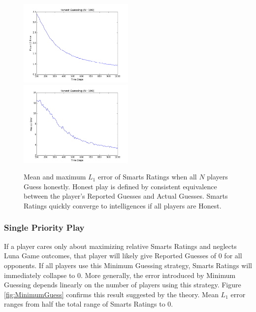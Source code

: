 \begin{figure}[h]
\centerline{%
\includegraphics[width=0.5\textwidth]{figures/robustness/Honest_Guessing21.png}%
\includegraphics[width=0.5\textwidth] {figures/robustness/Honest_Guessing22.png}%
}%
\caption{Mean and maximum $L_1$ error of Smarts Ratings when all $N$ players Guess honestly. Honest play is defined by consistent equivalence between the player's Reported Guesses and Actual Guesses. Smarts Ratings quickly converge to intelligences if all players are Honest.}
\label{fig:HonestGuess}
\end{figure}

\subsubsection{Single Priority Play}

If a player cares only about maximizing relative Smarts Ratings and neglects Luna Game outcomes, that player will likely give Reported Guesses of 0 for all opponents. If all players use this Minimum Guessing strategy, Smarts Ratings will immediately collapse to 0. More generally, the error introduced by Minimum Guessing depends linearly on the number of players using this strategy. Figure \ref{fig:MinimumGuess} confirms this result suggested by the theory. Mean $L_1$ error ranges from half the total range of Smarts Ratings to 0.

